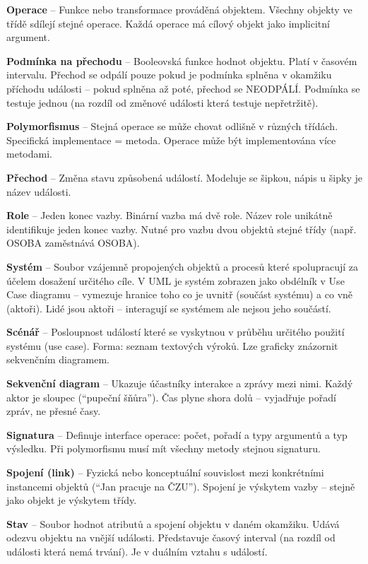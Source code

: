 \documentclass[12pt, a4paper]{article}
\begin{document}
\textbf{Operace} -- Funkce nebo transformace prováděná objektem. Všechny objekty ve třídě sdílejí stejné operace. Každá operace má cílový objekt jako implicitní argument.

\textbf{Podmínka na přechodu} -- Booleovská funkce hodnot objektu. Platí v časovém intervalu. Přechod se odpálí pouze pokud je podmínka splněna v okamžiku příchodu události -- pokud splněna až poté, přechod se NEODPÁLÍ. Podmínka se testuje jednou (na rozdíl od změnové události která testuje nepřetržitě).

\textbf{Polymorfismus} -- Stejná operace se může chovat odlišně v různých třídách. Specifická implementace = metoda. Operace může být implementována více metodami.

\textbf{Přechod} -- Změna stavu způsobená událostí. Modeluje se šipkou, nápis u šipky je název události.

\textbf{Role} -- Jeden konec vazby. Binární vazba má dvě role. Název role unikátně identifikuje jeden konec vazby. Nutné pro vazbu dvou objektů stejné třídy (např. OSOBA zaměstnává OSOBA).

\textbf{Systém} -- Soubor vzájemně propojených objektů a procesů které spolupracují za účelem dosažení určitého cíle. V UML je systém zobrazen jako obdélník v Use Case diagramu -- vymezuje hranice toho co je uvnitř (součást systému) a co vně (aktoři). Lidé jsou aktoři -- interagují se systémem ale nejsou jeho součástí.

\textbf{Scénář} -- Posloupnost událostí které se vyskytnou v průběhu určitého použití systému (use case). Forma: seznam textových výroků. Lze graficky znázornit sekvenčním diagramem.

\textbf{Sekvenční diagram} -- Ukazuje účastníky interakce a zprávy mezi nimi. Každý aktor je sloupec (``pupeční šňůra''). Čas plyne shora dolů -- vyjadřuje pořadí zpráv, ne přesné časy.

\textbf{Signatura} -- Definuje interface operace: počet, pořadí a typy argumentů a typ výsledku. Při polymorfismu musí mít všechny metody stejnou signaturu.

\textbf{Spojení (link)} -- Fyzická nebo konceptuální souvislost mezi konkrétními instancemi objektů (``Jan pracuje na ČZU''). Spojení je výskytem vazby -- stejně jako objekt je výskytem třídy.

\textbf{Stav} -- Soubor hodnot atributů a spojení objektu v daném okamžiku. Udává odezvu objektu na vnější události. Představuje časový interval (na rozdíl od události která nemá trvání). Je v duálním vztahu s událostí.
\end{document}
